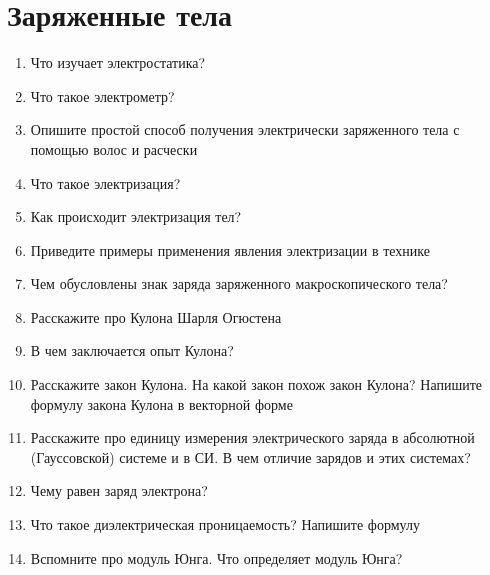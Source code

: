 \documentclass[12pt,a4paper]{report}
\begin{document}
\section{Заряженные тела}
\begin{enumerate}
\item Что изучает электростатика?
\item Что такое электрометр?
\item Опишите простой способ получения электрически заряженного тела с помощью волос и расчески
\item Что такое электризация?
\item Как происходит электризация тел?
\item Приведите примеры применения явления электризации в технике
\item Чем обусловлены знак заряда заряженного макроскопического тела?
\item Расскажите про Кулона Шарля Огюстена
\item В чем заключается опыт Кулона?
\item Расскажите закон Кулона. На какой закон похож закон Кулона? Напишите формулу закона Кулона в векторной форме
\item Расскажите про единицу измерения электрического заряда в абсолютной (Гауссовской) системе и в СИ. В чем отличие зарядов и этих системах?
\item Чему равен заряд электрона?
\item Что такое диэлектрическая проницаемость? Напишите формулу
\item Вспомните про модуль Юнга. Что определяет модуль Юнга?
\end{enumerate}
\end{document}
